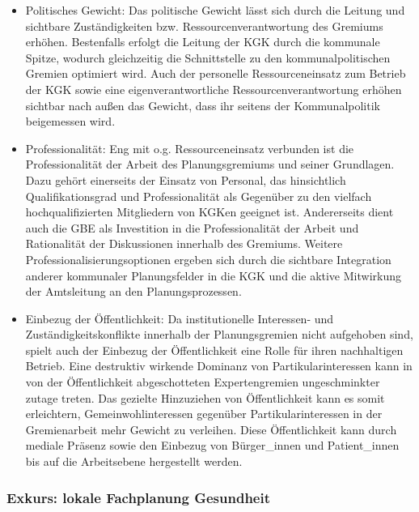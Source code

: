 \documentclass{article}
\begin{document}
\begin{itemize}
\item Politisches Gewicht: Das politische Gewicht lässt sich durch die Leitung und sichtbare Zuständigkeiten bzw. Ressourcenverantwortung des Gremiums erhöhen. Bestenfalls erfolgt die Leitung der KGK durch die kommunale Spitze, wodurch gleichzeitig die Schnittstelle zu den kommunalpolitischen Gremien optimiert wird. Auch der personelle Ressourceneinsatz zum Betrieb der KGK sowie eine eigenverantwortliche Ressourcenverantwortung erhöhen sichtbar nach außen das Gewicht, dass ihr seitens der Kommunalpolitik beigemessen wird\autocite{Albrichundweitere2017}.


\item Professionalität: Eng mit o.g. Ressourceneinsatz verbunden ist die Professionalität der Arbeit des Planungsgremiums und seiner Grundlagen. Dazu gehört einerseits der Einsatz von Personal, das hinsichtlich Qualifikationsgrad und Professionalität als Gegenüber zu den vielfach hochqualifizierten Mitgliedern von KGKen geeignet ist. Andererseits dient auch die GBE als Investition in die Professionalität der Arbeit und Rationalität der Diskussionen innerhalb des Gremiums. Weitere Professionalisierungsoptionen ergeben sich durch die sichtbare Integration anderer kommunaler Planungsfelder in die KGK und die aktive Mitwirkung der Amtsleitung an den Planungsprozessen.


\item Einbezug der Öffentlichkeit: Da institutionelle Interessen- und Zuständigkeitskonflikte innerhalb der Planungsgremien nicht aufgehoben sind, spielt auch der Einbezug der Öffentlichkeit eine Rolle für ihren nachhaltigen Betrieb. Eine destruktiv wirkende Dominanz von Partikularinteressen kann in von der Öffentlichkeit abgeschotteten Expertengremien ungeschminkter zutage treten. Das gezielte Hinzuziehen von Öffentlichkeit kann es somit erleichtern, Gemeinwohlinteressen gegenüber Partikularinteressen in der Gremienarbeit mehr Gewicht zu verleihen. Diese Öffentlichkeit kann durch mediale Präsenz sowie den Einbezug von Bürger\_innen und Patient\_innen bis auf die Arbeitsebene hergestellt werden\autocite{Szagunundweitere2002}.


\end{itemize}

\subsubsection{Exkurs: lokale Fachplanung Gesundheit}\label{H4813093}
\end{document}
